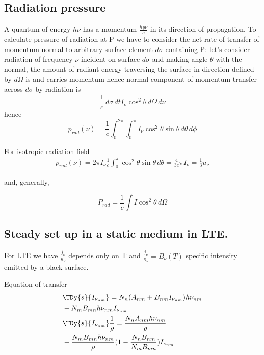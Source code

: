 \subsection{Radiation pressure}

A quantum of energy $h\nu$ has a momentum $\frac{hy\nu}{c}$ in its direction of propagation. To calculate pressure of radiation at P we have to consider the net rate of transfer of momentum normal to arbitrary surface element $d\sigma$ containing P:
let's consider radiation of frequency $\nu$ incident on surface $d\sigma$ and making angle $\theta$ with the normal, the amount of radiant energy traversing the surface in direction defined by $d\Omega$ is  and carries momentum  hence normal component of momentum transfer across $d\sigma$ by radiation is
\begin{equation*}
\frac{1}{c}\,d\sigma\,dtI_{\nu}\cos^2{\theta}\,d\Omega\,d\nu
\end{equation*}
hence
\begin{equation*}
p_{rad}(\nu)=\frac{1}{c}\int_0^{2\pi}\int_0^{\pi}I_{\nu}\cos^2{\theta}\sin{\theta}\,d\theta\,d\phi
\end{equation*}

For isotropic radiation field
\begin{align*}
p_{rad}(\nu)=2\pi I_{\nu}\frac{1}{c}\int_0^{\pi}\cos^2{\theta}\sin{\theta}\,d\theta=\frac{4}{3c}\pi I_{\nu}=\frac{1}{3}u_{\nu}
\end{align*}

and, generally,

\begin{equation*}
P_{rad}=\frac{1}{c}\int I\cos^2{\theta}\,d\Omega
\end{equation*}

\subsection{Steady set up in a static medium in LTE.}

For LTE we have $\frac{j_{\nu}}{\kappa_{\nu}}$ depends only on T and $\frac{j_{\nu}}{\kappa_{\nu}}=B_{\nu}(T)$ specific intensity emitted by a black surface.

Equation of transfer
\begin{align*}
&\TDy{s}{I_{\nu_{nm}}}=N_n(A_{nm}+B_{nm}I_{\nu_{nm}})h\nu_{nm}\\
&-N_mB_{mn}h\nu_{nm}I_{\nu_{nm}}\\
&\TDy{s}{I_{\nu_{nm}}}\frac{1}{\rho}=\frac{N_nA_{nm}h\nu_{nm}}{\rho}\\
&-\frac{N_mB_{mn}h\nu_{nm}}{\rho}(1-\frac{N_nB_{nm}}{N_mB_{mn}})I_{\nu_{nm}}
\end{align*}

